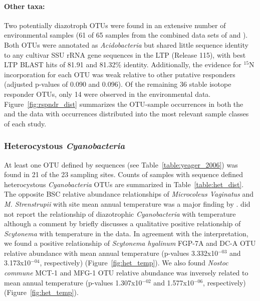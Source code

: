 \paragraph{\textbf{Other taxa:}} 
Two potentially diazotroph OTUs were found in an extensive number of
environmental samples (61 of 65 samples from the combined data sets of
\citet{Garcia_Pichel_2013} and \citet{Steven_2013}). Both OTUs were annotated
as \textit{Acidobacteria} but shared little sequence identity to any cultivar
SSU rRNA gene sequences in the LTP (Release 115), with best LTP BLAST hits of
81.91 and 81.32\% identity. Additionally, the evidence for $^{15}$N
incorporation for each OTU was weak relative to other putative responders
(adjusted p-values of 0.090 and 0.096). Of the remaining 36 stable isotope
responder OTUs, only 14 were observed in the environmental data.
Figure~\ref{fig:rspndr_dist} summarizes the OTU-sample occurrences in both the
\citet{Steven_2013} and the \citet{Garcia_Pichel_2013} data with occurrences
distributed into the most relevant sample classes of each study.

\subsubsection{Heterocystous \textit{Cyanobacteria}} 
At least one OTU defined by \citet{Yeager} sequences (see
Table~\ref{table:yeager_2006}) was found in 21 of the 23
\citet{Garcia_Pichel_2013} sampling sites. Counts of samples with
\citet{Yeager} sequence defined heterocystous \textit{Cyanobacteria} OTUs are
summarized in Table~\ref{table:het_dist}. The opposite BSC relative abundance
relationships of \textit{Microcoleus Vaginatus} and \textit{M.  Strenstrupii}
with site mean annual temperature was a major finding by
\citet{Garcia_Pichel_2013}.  \citet{Garcia_Pichel_2013} did not report the
relationship of diazotrophic \textit{Cyanobacteria} with temperature although a
comment by \citet{Belnap28062013} briefly discusses a qualitative positive
relationship of \textit{Scytonema} with temperature in the
\citet{Garcia_Pichel_2013} data.  In agreement with the \citet{Belnap28062013}
interpretation, we found a positive relationship of \textit{Scytonema hyalinum}
FGP-7A and DC-A OTU relative abundance with mean annual temperature (p-values
3.332x10$^{-03}$ and 3.173x10$^{-04}$, respectively)
(Figure~\ref{fig:het_temp}). We also found \textit{Nostoc commune} MCT-1 and
MFG-1 OTU relative abundance was inversely related to mean annual temperature
(p-values 1.307x10$^{-02}$ and 1.577x10$^{-06}$, respectively)
(Figure~\ref{fig:het_temp}). 

